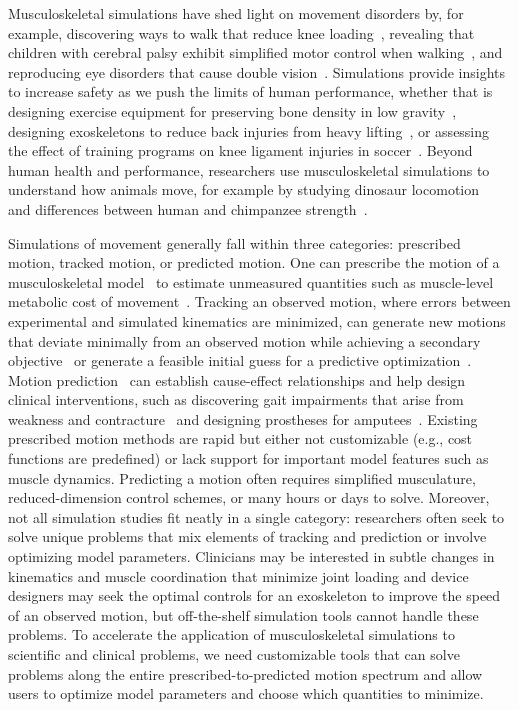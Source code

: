 \documentclass[10pt,letterpaper]{article}
\begin{document}
Musculoskeletal simulations have shed light on movement disorders by, for example, discovering ways to walk that reduce knee loading~\cite{Fregly:2007ac}, revealing that children with cerebral palsy exhibit simplified motor control when walking~\cite{Steele:2015}, and reproducing eye disorders that cause double vision~\cite{Priamikov:2016}. Simulations provide insights to increase safety as we push the limits of human performance, whether that is designing exercise equipment for preserving bone density in low gravity~\cite{Fregly:2015}, designing exoskeletons to reduce back injuries from heavy lifting~\cite{Manns:2016}, or assessing the effect of training programs on knee ligament injuries in soccer~\cite{Thompson:2017}. Beyond human health and performance, researchers use musculoskeletal simulations to understand how animals move, for example by studying dinosaur locomotion~\cite{sthaya:2005uk} and differences between human and chimpanzee strength~\cite{ONeill:2017}.

Simulations of movement generally fall within three categories: prescribed motion, tracked motion, or predicted motion. One can prescribe the motion of a musculoskeletal model~\cite{Thelen:2003bba,Lloyd:2003} to estimate unmeasured quantities such as muscle-level metabolic cost of movement~\cite{Farris:2014du,Jackson:2017go}. Tracking an observed motion, where errors between experimental and simulated kinematics are minimized, can generate new motions that deviate minimally from an observed motion while achieving a secondary objective~\cite{Fregly:2007ac} or generate a feasible initial guess for a predictive optimization~\cite{Lin:2017jp}. Motion prediction~\cite{Geijtenbeek:2019} can establish cause-effect relationships and help design clinical interventions, such as discovering gait impairments that arise from weakness and contracture~\cite{Ong:2019a} and designing prostheses for amputees~\cite{Handford:2016kd}. Existing prescribed motion methods are rapid but either not customizable (e.g., cost functions are predefined) or lack support for important model features such as muscle dynamics. Predicting a motion often requires simplified musculature, reduced-dimension control schemes, or many hours or days to solve. Moreover, not all simulation studies fit neatly in a single category: researchers often seek to solve unique problems that mix elements of tracking and prediction or involve optimizing model parameters. Clinicians may be interested in subtle changes in kinematics and muscle coordination that minimize joint loading and device designers may seek the optimal controls for an exoskeleton to improve the speed of an observed motion, but off-the-shelf simulation tools cannot handle these problems. To accelerate the application of musculoskeletal simulations to scientific and clinical problems, we need customizable tools that can solve problems along the entire prescribed-to-predicted motion spectrum and allow users to optimize model parameters and choose which quantities to minimize.
\end{document}

